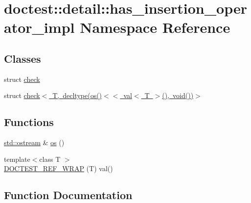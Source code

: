 \hypertarget{namespacedoctest_1_1detail_1_1has__insertion__operator__impl}{}\section{doctest\+:\+:detail\+:\+:has\+\_\+insertion\+\_\+operator\+\_\+impl Namespace Reference}
\label{namespacedoctest_1_1detail_1_1has__insertion__operator__impl}
\subsection*{Classes}
\begin{DoxyCompactItemize}
\item 
struct \mbox{\hyperlink{structdoctest_1_1detail_1_1has__insertion__operator__impl_1_1check}{check}}
\item 
struct \mbox{\hyperlink{structdoctest_1_1detail_1_1has__insertion__operator__impl_1_1check_3_01_t_00_01decltype_07os_07_8d91d0ae55ab2b557e111ab3ba9c02da}{check$<$ T, decltype(os()$<$$<$ val$<$ T $>$(), void())$>$}}
\end{DoxyCompactItemize}
\subsection*{Functions}
\begin{DoxyCompactItemize}
\item 
\mbox{\hyperlink{doctest_8h_a116af65cb5e924b33ad9d9ecd7a783f3}{std\+::ostream}} \& \mbox{\hyperlink{namespacedoctest_1_1detail_1_1has__insertion__operator__impl_a0f6ad916f976eb5821e2cddd91c3053d}{os}} ()
\item 
{\footnotesize template$<$class T $>$ }\\\mbox{\hyperlink{namespacedoctest_1_1detail_1_1has__insertion__operator__impl_aca675e788cb45921358501d70f0a2529}{D\+O\+C\+T\+E\+S\+T\+\_\+\+R\+E\+F\+\_\+\+W\+R\+AP}} (T) val()
\end{DoxyCompactItemize}


\subsection{Function Documentation}
\mbox{\label{namespacedoctest_1_1detail_1_1has__insertion__operator__impl_aca675e788cb45921358501d70f0a2529}} 
